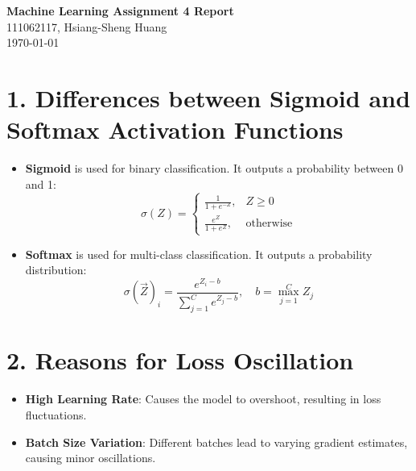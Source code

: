 \documentclass[10pt]{article}  %
\begin{document}
\begin{center}
    \textbf{\large Machine Learning Assignment 4 Report}\\
    111062117, Hsiang-Sheng Huang \\
    \today
\end{center}

\section*{1. Differences between Sigmoid and Softmax Activation Functions}
\begin{itemize}
    \item \textbf{Sigmoid} is used for binary classification. It outputs a probability between 0 and 1:
    \[
    \sigma(Z) = \begin{cases}
    \frac{1}{1 + e^{-Z}}, & Z \geq 0 \\
    \frac{e^Z}{1 + e^Z}, & \text{otherwise}
    \end{cases}
    \]
    \item \textbf{Softmax} is used for multi-class classification. It outputs a probability distribution:
    \[
    \sigma(\vec{Z})_i = \frac{e^{Z_i - b}}{\sum_{j=1}^{C} e^{Z_j - b}}, \quad b = \max_{j=1}^C Z_j
    \]
\end{itemize}

\section*{2. Reasons for Loss Oscillation}
\begin{itemize}
    \item \textbf{High Learning Rate}: Causes the model to overshoot, resulting in loss fluctuations.
    \item \textbf{Batch Size Variation}: Different batches lead to varying gradient estimates, causing minor oscillations.
\end{itemize}
\end{document}
